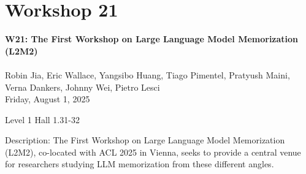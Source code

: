 \clearpage


\section[W21: The First Workshop on Large Language Model Memorization (L2M2)]{Workshop 21}
\label{workshop_21}

\begin{center}
    {\Large \textbf{W21: The First Workshop on Large Language Model Memorization (L2M2)}}\\
    
\\

Robin Jia, Eric Wallace, Yangsibo Huang, Tiago Pimentel, Pratyush Maini, Verna Dankers, Johnny Wei, Pietro Lesci\\

    Friday, August 1, 2025

    Level 1 Hall 1.31-32
    
\end{center}

Description: The First Workshop on Large Language Model Memorization (L2M2), co-located with ACL 2025 in Vienna, seeks to provide a central venue for researchers studying LLM memorization from these different angles.

